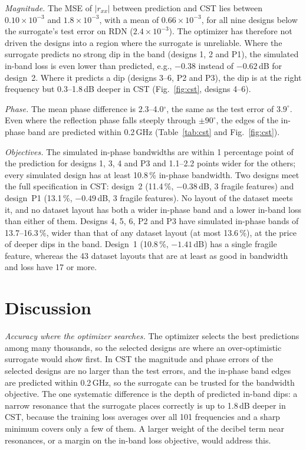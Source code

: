 \documentclass[journal]{IEEEtran}
\newcommand{\e}[2]{#1{\times}10^{#2}}
\begin{document}
\emph{Magnitude.} The MSE of $|r_{xx}|$ between prediction and CST lies between $\e{0.10}{-3}$ and $\e{1.8}{-3}$, with a mean of $\e{0.66}{-3}$, for all nine designs below the surrogate's test error on RDN ($\e{2.4}{-3}$). The optimizer has therefore not driven the designs into a region where the surrogate is unreliable. Where the surrogate predicts no strong dip in the band (designs 1, 2 and P1), the simulated in-band loss is even lower than predicted, e.g., $-0.38$ instead of $-0.62$\,dB for design~2. Where it predicts a dip (designs 3--6, P2 and P3), the dip is at the right frequency but 0.3--1.8\,dB deeper in CST (Fig.~\ref{fig:cst}, designs 4--6).

\emph{Phase.} The mean phase difference is 2.3--4.0$^\circ$, the same as the test error of $3.9^\circ$. Even where the reflection phase falls steeply through $\pm90^\circ$, the edges of the in-phase band are predicted within 0.2\,GHz (Table~\ref{tab:cst} and Fig.~\ref{fig:cst}).

\emph{Objectives.} The simulated in-phase bandwidths are within 1 percentage point of the prediction for designs 1, 3, 4 and P3 and 1.1--2.2 points wider for the others; every simulated design has at least 10.8\,\% in-phase bandwidth. Two designs meet the full specification in CST: design~2 (11.4\,\%, $-0.38$\,dB, 3 fragile features) and design~P1 (13.1\,\%, $-0.49$\,dB, 3 fragile features). No layout of the dataset meets it, and no dataset layout has both a wider in-phase band and a lower in-band loss than either of them. Designs 4, 5, 6, P2 and P3 have simulated in-phase bands of 13.7--16.3\,\%, wider than that of any dataset layout (at most 13.6\,\%), at the price of deeper dips in the band. Design~1 (10.8\,\%, $-1.41$\,dB) has a single fragile feature, whereas the 43 dataset layouts that are at least as good in bandwidth and loss have 17 or more.

\section{Discussion}
\emph{Accuracy where the optimizer searches.} The optimizer selects the best predictions among many thousands, so the selected designs are where an over-optimistic surrogate would show first. In CST the magnitude and phase errors of the selected designs are no larger than the test errors, and the in-phase band edges are predicted within 0.2\,GHz, so the surrogate can be trusted for the bandwidth objective. The one systematic difference is the depth of predicted in-band dips: a narrow resonance that the surrogate places correctly is up to 1.8\,dB deeper in CST, because the training loss averages over all 101 frequencies and a sharp minimum covers only a few of them. A larger weight of the decibel term near resonances, or a margin on the in-band loss objective, would address this.
\end{document}
